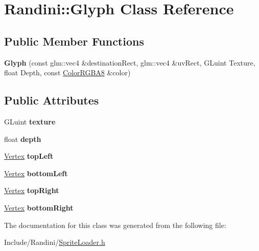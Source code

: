 \hypertarget{classRandini_1_1Glyph}{
\section{Randini::Glyph Class Reference}
\label{classRandini_1_1Glyph}
}
\subsection*{Public Member Functions}
\begin{DoxyCompactItemize}
\item 
\hypertarget{classRandini_1_1Glyph_a14fd7b79d6d01c71bdd82332b1f34371}{
{\bfseries Glyph} (const glm::vec4 \&destinationRect, glm::vec4 \&uvRect, GLuint Texture, float Depth, const \hyperlink{structRandini_1_1ColorRGBA8}{ColorRGBA8} \&color)}
\label{classRandini_1_1Glyph_a14fd7b79d6d01c71bdd82332b1f34371}

\end{DoxyCompactItemize}
\subsection*{Public Attributes}
\begin{DoxyCompactItemize}
\item 
\hypertarget{classRandini_1_1Glyph_af3667938fd80ddfdcf2d0690d227d6bb}{
GLuint {\bfseries texture}}
\label{classRandini_1_1Glyph_af3667938fd80ddfdcf2d0690d227d6bb}

\item 
\hypertarget{classRandini_1_1Glyph_a8130f05b1e9ac37c6422b981709f1faa}{
float {\bfseries depth}}
\label{classRandini_1_1Glyph_a8130f05b1e9ac37c6422b981709f1faa}

\item 
\hypertarget{classRandini_1_1Glyph_a81f10d38eecced6e3aae7638e33ae3e6}{
\hyperlink{structRandini_1_1Vertex}{Vertex} {\bfseries topLeft}}
\label{classRandini_1_1Glyph_a81f10d38eecced6e3aae7638e33ae3e6}

\item 
\hypertarget{classRandini_1_1Glyph_a77d59c9524bdb6ad7fb2ff98c3010c5c}{
\hyperlink{structRandini_1_1Vertex}{Vertex} {\bfseries bottomLeft}}
\label{classRandini_1_1Glyph_a77d59c9524bdb6ad7fb2ff98c3010c5c}

\item 
\hypertarget{classRandini_1_1Glyph_a0ff0b38ae745ed6096269060b43f949e}{
\hyperlink{structRandini_1_1Vertex}{Vertex} {\bfseries topRight}}
\label{classRandini_1_1Glyph_a0ff0b38ae745ed6096269060b43f949e}

\item 
\hypertarget{classRandini_1_1Glyph_ae0cb1412ee92898d262840eca9f14f6b}{
\hyperlink{structRandini_1_1Vertex}{Vertex} {\bfseries bottomRight}}
\label{classRandini_1_1Glyph_ae0cb1412ee92898d262840eca9f14f6b}

\end{DoxyCompactItemize}


The documentation for this class was generated from the following file:\begin{DoxyCompactItemize}
\item 
Include/Randini/\hyperlink{SpriteLoader_8h}{SpriteLoader.h}\end{DoxyCompactItemize}
